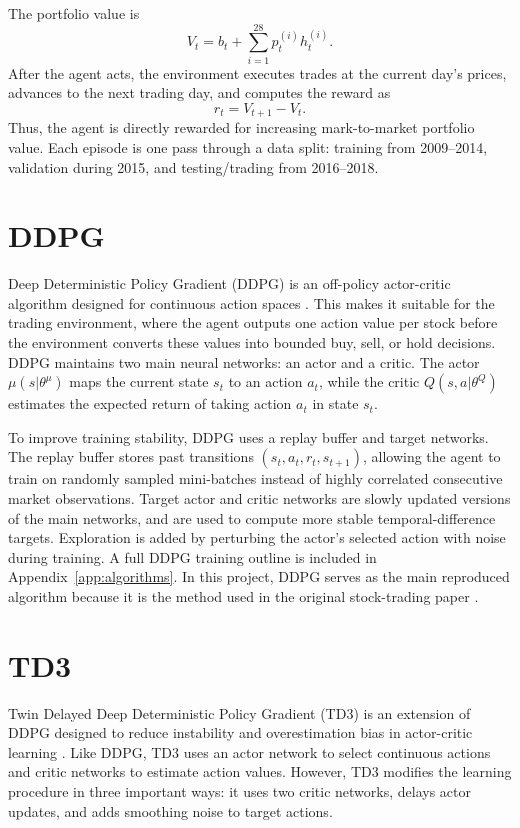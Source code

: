 \documentclass{article}
\begin{document}
The portfolio value is
\[
V_t = b_t + \sum_{i=1}^{28} p_t^{(i)} h_t^{(i)}.
\]
After the agent acts, the environment executes trades at the current day's prices, advances to the next trading day, and computes the reward as
\[
r_t = V_{t+1} - V_t.
\]
Thus, the agent is directly rewarded for increasing mark-to-market portfolio value. Each episode is one pass through a data split: training from 2009--2014, validation during 2015, and testing/trading from 2016--2018.


\section{DDPG}

Deep Deterministic Policy Gradient (DDPG) is an off-policy actor-critic algorithm designed for continuous action spaces \cite{lillicrap2015}. This makes it suitable for the trading environment, where the agent outputs one action value per stock before the environment converts these values into bounded buy, sell, or hold decisions. DDPG maintains two main neural networks: an actor and a critic. The actor $\mu(s|\theta^\mu)$ maps the current state $s_t$ to an action $a_t$, while the critic $Q(s,a|\theta^Q)$ estimates the expected return of taking action $a_t$ in state $s_t$.

To improve training stability, DDPG uses a replay buffer and target networks. The replay buffer stores past transitions $(s_t,a_t,r_t,s_{t+1})$, allowing the agent to train on randomly sampled mini-batches instead of highly correlated consecutive market observations. Target actor and critic networks are slowly updated versions of the main networks, and are used to compute more stable temporal-difference targets. Exploration is added by perturbing the actor's selected action with noise during training. A full DDPG training outline is included in Appendix~\ref{app:algorithms}. In this project, DDPG serves as the main reproduced algorithm because it is the method used in the original stock-trading paper \cite{liu2018practical}.

\section{TD3}

Twin Delayed Deep Deterministic Policy Gradient (TD3) is an extension of DDPG designed to reduce instability and overestimation bias in actor-critic learning \cite{fujimoto2018}. Like DDPG, TD3 uses an actor network to select continuous actions and critic networks to estimate action values. However, TD3 modifies the learning procedure in three important ways: it uses two critic networks, delays actor updates, and adds smoothing noise to target actions.
\end{document}
